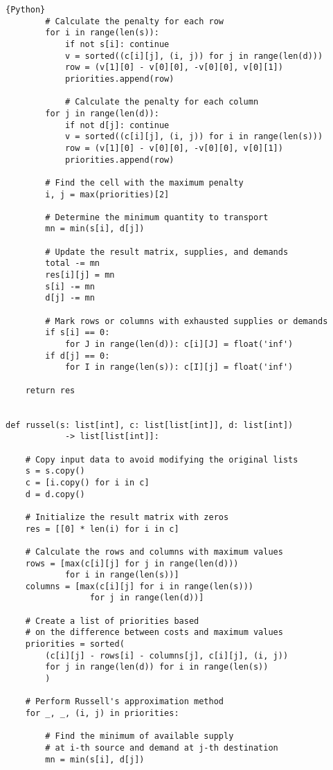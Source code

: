 \documentclass[12pt, legalpaper]{exam}
\begin{document}
\begin{lstlisting}{Python}
        # Calculate the penalty for each row
        for i in range(len(s)):
            if not s[i]: continue
            v = sorted((c[i][j], (i, j)) for j in range(len(d)))
            row = (v[1][0] - v[0][0], -v[0][0], v[0][1])
            priorities.append(row)
        
            # Calculate the penalty for each column
        for j in range(len(d)):
            if not d[j]: continue
            v = sorted((c[i][j], (i, j)) for i in range(len(s)))
            row = (v[1][0] - v[0][0], -v[0][0], v[0][1])
            priorities.append(row)

        # Find the cell with the maximum penalty
        i, j = max(priorities)[2]
        
        # Determine the minimum quantity to transport
        mn = min(s[i], d[j])

        # Update the result matrix, supplies, and demands
        total -= mn
        res[i][j] = mn
        s[i] -= mn
        d[j] -= mn

        # Mark rows or columns with exhausted supplies or demands
        if s[i] == 0:
            for J in range(len(d)): c[i][J] = float('inf')
        if d[j] == 0:
            for I in range(len(s)): c[I][j] = float('inf')

    return res


def russel(s: list[int], c: list[list[int]], d: list[int]) 
            -> list[list[int]]:

    # Copy input data to avoid modifying the original lists
    s = s.copy()
    c = [i.copy() for i in c]
    d = d.copy()

    # Initialize the result matrix with zeros
    res = [[0] * len(i) for i in c]

    # Calculate the rows and columns with maximum values
    rows = [max(c[i][j] for j in range(len(d))) 
            for i in range(len(s))]
    columns = [max(c[i][j] for i in range(len(s)))
                 for j in range(len(d))]

    # Create a list of priorities based 
    # on the difference between costs and maximum values
    priorities = sorted(
        (c[i][j] - rows[i] - columns[j], c[i][j], (i, j)) 
        for j in range(len(d)) for i in range(len(s))
        )

    # Perform Russell's approximation method
    for _, _, (i, j) in priorities:
        
        # Find the minimum of available supply 
        # at i-th source and demand at j-th destination
        mn = min(s[i], d[j])
        

\end{lstlisting}
\end{document}
